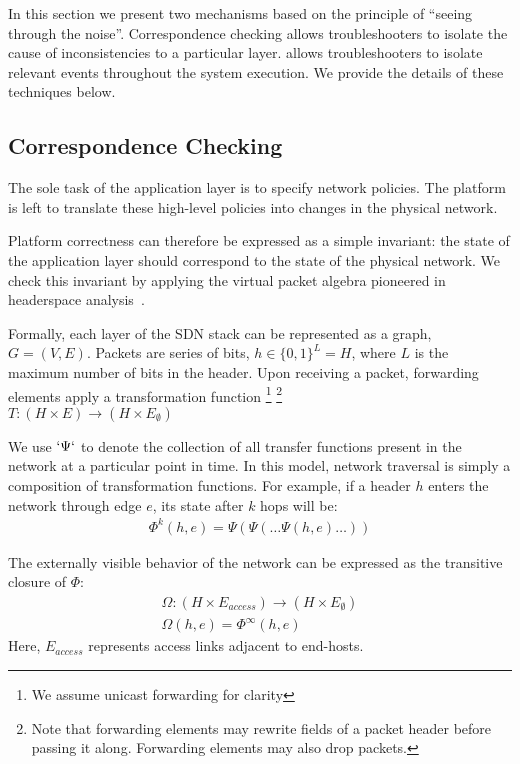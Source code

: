 In this section we present two mechanisms based on the principle of ``seeing
through the noise''. Correspondence checking allows troubleshooters to isolate
the cause of inconsistencies to a particular layer. \Simulator{}
allows troubleshooters to isolate relevant events throughout the system
execution. We provide the details of these techniques below. 

\subsection{Correspondence Checking}

The sole task of the application layer is to specify network
policies. The platform is left to translate these high-level policies
into changes in the physical network.

Platform correctness can therefore be expressed as a simple invariant:
the state of the application layer should correspond to the state of the
physical network. We check this invariant by applying the virtual packet
algebra pioneered in headerspace analysis~\cite{hsa}. 

Formally, each layer of the SDN stack can be represented as a graph,
$G = (V, E)$. Packets are series of bits, $h \in \{0,1\}^L = H$,
where $L$ is the maximum number of bits in the header. Upon receiving a packet,
forwarding elements apply a transformation function \footnote{We assume unicast forwarding for clarity}
\footnote{Note that forwarding elements may rewrite fields of a packet header
before passing it along. Forwarding elements may also drop packets.} \\
$T: (H \times E) \rightarrow (H \times E_{\emptyset})$

We use $`\Psi`$ to denote the collection of all transfer functions present in
the network at a particular point in time. In this model, network traversal is simply a composition of transformation
functions. For example, if a header $h$ enters the network through edge
$e$, its state after $k$ hops will be:
\begin{align*}
\Phi^k(h,e) = \Psi(\Psi(\dots \Psi(h,e)\dots))
\end{align*}

The externally visible behavior of the network can be expressed as the
transitive closure of $\Phi$:
\begin{align*}
\Omega: (H \times E_{access}) \rightarrow (H \times E_{\emptyset}) \\
\Omega(h,e) = \Phi^{\infty}(h,e)
\end{align*}
Here, $E_{access}$ represents access links adjacent to end-hosts.

